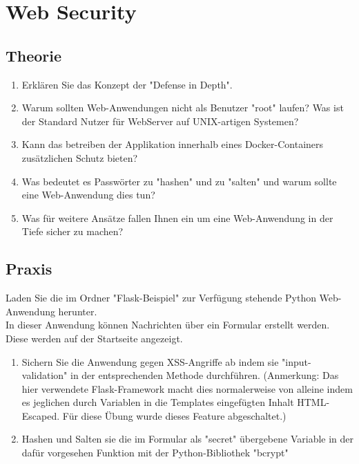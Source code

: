 \documentclass{article}
\begin{document}
\section{Web Security}

\subsection{Theorie}
\begin{enumerate}
    \item Erklären Sie das Konzept der "Defense in Depth".
    \item Warum sollten Web-Anwendungen nicht als Benutzer "root" laufen? Was ist der Standard Nutzer für WebServer auf UNIX-artigen Systemen?
    \item Kann das betreiben der Applikation innerhalb eines Docker-Containers zusätzlichen Schutz bieten?
    \item Was bedeutet es Passwörter zu "hashen" und zu "salten" und warum sollte eine Web-Anwendung dies tun?
    \item Was für weitere Ansätze fallen Ihnen ein um eine Web-Anwendung in der Tiefe sicher zu machen?
\end{enumerate}

\subsection{Praxis}
Laden Sie die im Ordner "Flask-Beispiel" zur Verfügung stehende Python Web-Anwendung herunter. \\
In dieser Anwendung können Nachrichten über ein Formular erstellt werden. Diese werden auf der Startseite angezeigt.

\begin{enumerate}
    \item Sichern Sie die Anwendung gegen XSS-Angriffe ab indem sie "input-validation" in der entsprechenden Methode durchführen. (Anmerkung: Das hier verwendete Flask-Framework macht dies normalerweise von alleine indem es jeglichen durch Variablen in die Templates eingefügten Inhalt HTML-Escaped. Für diese Übung wurde dieses Feature abgeschaltet.)
    \item Hashen und Salten sie die im Formular als "secret" übergebene Variable in der dafür vorgesehen Funktion mit der Python-Bibliothek "bcrypt"
\end{enumerate}
\end{document}
